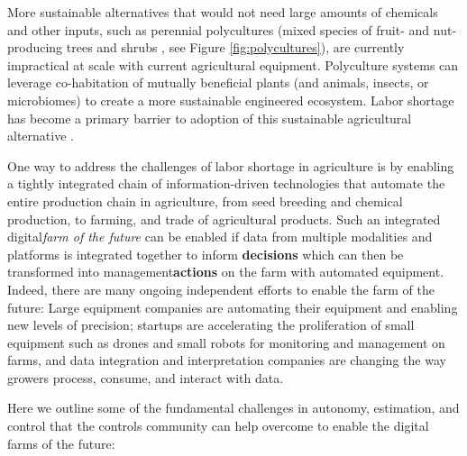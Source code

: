More sustainable alternatives that would not need large amounts of chemicals and other inputs, such as perennial polycultures (mixed species of fruit- and nut-producing trees and shrubs \cite{lovell2017temperate}, see Figure \ref{fig:polycultures}), are currently impractical at scale with current agricultural equipment. Polyculture systems can leverage co-habitation of mutually beneficial plants (and animals, insects, or microbiomes) to create a more sustainable engineered ecosystem. Labor shortage has become a primary barrier to adoption of this sustainable agricultural alternative \cite{RN4017,RN4018}.  %


One way to address the challenges of labor shortage in agriculture is by enabling a tightly integrated chain of information-driven technologies that automate the entire production ​chain in agriculture, from seed breeding and chemical production, to farming, and trade of agricultural products. Such an integrated ​digital\textit{farm of the future} can be enabled if ​data from multiple modalities and platforms is integrated together to inform \textbf{​decisions} which can then be transformed into management\textbf{​actions} on the farm with automated equipment. Indeed, there are many ongoing independent efforts to enable the farm of the future: Large equipment companies are automating their equipment and enabling new levels of precision; startups are accelerating the proliferation of small equipment such as drones and small robots for monitoring and management on farms, and data integration and interpretation companies are changing the way growers process, consume, and interact with data.

Here we outline some of the fundamental challenges in autonomy, estimation, and control that the controls community can help overcome to enable the digital farms of the future:


